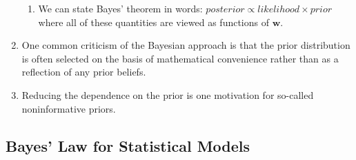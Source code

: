 \begin{enumerate}
\begin{enumerate}
        \item We can state Bayes’ theorem in words:
        $
            posterior \propto likelihood \times prior
        $
        where all of these quantities are viewed as functions of $\bm{w}$.
        \hfill \cite{ml/book/Pattern-Recognition-And-Machine-Learning/Christopher-M-Bishop}
    \end{enumerate}

    \item One common criticism of the Bayesian approach is that the prior distribution is often selected on the basis of mathematical convenience rather than as a reflection of any prior beliefs.
    \hfill \cite{ml/book/Pattern-Recognition-And-Machine-Learning/Christopher-M-Bishop}

    \item Reducing the dependence on the prior is one motivation for so-called noninformative priors.
    \hfill \cite{ml/book/Pattern-Recognition-And-Machine-Learning/Christopher-M-Bishop}
\end{enumerate}



\subsection{Bayes’ Law for Statistical Models}

